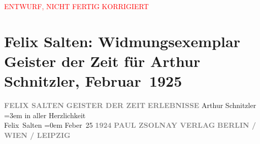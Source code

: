 
\begin{center}
            \textcolor{red}{ENTWURF, NICHT FERTIG KORRIGIERT}
                      \end{center}
            
         
         \renewcommand{\erwaehntePersonen}{Personen: Felix Salten}
         \renewcommand{\erwaehnteInstitutionen}{Institutionen: Paul Zsolnay Verlag}
         \renewcommand{\erwaehnteOrte}{Orte: Berlin, Leipzig, Wien}
         \renewcommand{\erwaehnteWerke}{Werke: Geister der Zeit. Erlebnisse}
               \section[Felix Salten: Widmungsexemplar Geister der Zeit für Arthur Schnitzler, Februar 1925]{ Felix Salten: Widmungsexemplar Geister der Zeit für Arthur Schnitzler,
               Februar 1925}\nopagebreak{}\rehead{ }\begin{ledgroupsized}[t]{13cm}\normalsize\beginnumbering \toendnotes[C]{\smallbreak\pagebreak[2]} 
\pstart
           \noindent{}\centering{}{\pb}\textcolor{gray}{\textbf{FELIX SALTEN}}\pend
           \pstart
           \noindent{}\centering{}\textcolor{gray}{\textbf{GEISTER DER ZEIT}}\pend
           \pstart
           \noindent{}\centering{}\textcolor{gray}{\textbf{ERLEBNISSE}}\pend
           {\bigskip}\pstart
           \noindent{}Arthur Schnitzler\pend
           \leftskip=3em{}\pstart
           \noindent{}in aller Herzlichkeit {\\}\spacefill\mbox{Felix Salten}\pend
           \leftskip=0em{}\pstart
           Feber 25\pend
           {\bigskip}\pstart
           \noindent{}\centering{}\textcolor{gray}{\textbf{1924}}\pend
           \pstart
           \noindent{}\centering{}\textcolor{gray}{\textbf{PAUL ZSOLNAY VERLAG}}\pend
           \pstart
           \noindent{}\centering{}\textcolor{gray}{\textbf{BERLIN / WIEN / LEIPZIG}}\pend
           
         
         \endnumbering{}\end{ledgroupsized}  \newcommand{\dateiname}{L03042}\newcommand{\titel}{Felix Salten: Widmungsexemplar Geister der Zeit für Arthur Schnitzler, Februar 1925}\newcommand{\editorInnen}{Martin Anton Müller und Laura Untner}
      